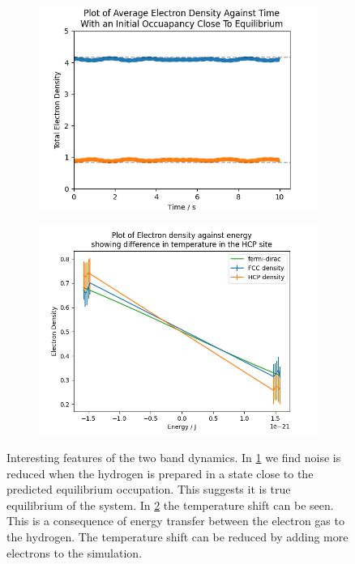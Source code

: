 \begin{figure}[htbp]
    \centering
    \begin{subfigure}{0.45\linewidth}
        \includegraphics[width=0.9\linewidth]{Figures/Simulation/Two Small Bands Probability Clsoe To Equilibrium.png}
        \label{fig:two band close to equilibrium}
    \end{subfigure}
    \begin{subfigure}{0.45\linewidth}
        \includegraphics[width=0.9\linewidth]{Figures/Simulation/two band electron distribution.png}
        \label{fig:two band temperature shift}
    \end{subfigure}
    \caption{
        Interesting features of the two
        band dynamics.
        In \cref{fig:two band close to equilibrium}
        we find noise is reduced when the
        hydrogen is prepared in a state
        close to the predicted equilibrium
        occupation. This suggests it is
        true equilibrium of the
        system.
        In \cref{fig:two band temperature shift}
        the temperature shift can be seen.
        This is a consequence of energy transfer
        between the electron gas to the
        hydrogen. The temperature
        shift can be reduced by adding
        more electrons to the
        simulation.
    }\label{fig:final notes two band}
\end{figure}